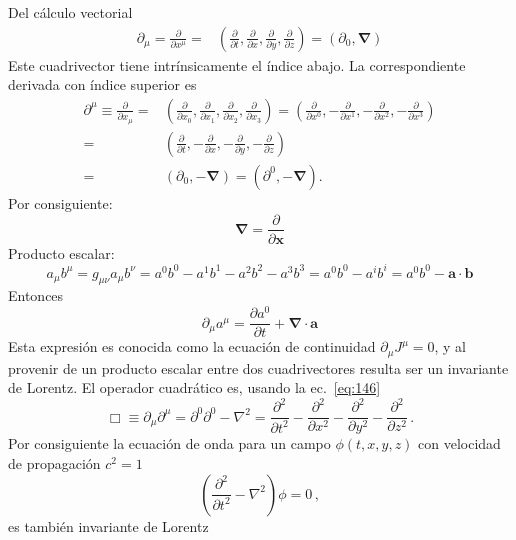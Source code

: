 \begin{frame}
  Del cálculo vectorial
  \begin{align}
      \partial_\mu=\frac{\partial}{\partial x^\mu}=&\left(
    \frac{\partial}{\partial t},\frac{\partial}{\partial x},\frac{\partial}{\partial y},\frac{\partial}{\partial z}
  \right)
  =(\partial_0,\boldsymbol{\nabla})
  \end{align}
Este cuadrivector tiene intrínsicamente el índice abajo. La correspondiente derivada con índice superior es  
\begin{align}
  \partial^\mu\equiv\frac{\partial}{\partial x_\mu}=&
  \left(
    \frac{\partial}{\partial x_0},\frac{\partial}{\partial x_1},\frac{\partial}{\partial x_2},\frac{\partial}{\partial x_3}
  \right)=\left(
    \frac{\partial}{\partial x^0},-\frac{\partial}{\partial x^1},-\frac{\partial}{\partial x^2},-\frac{\partial}{\partial x^3}
  \right)\nonumber\\
  =&\left(
    \frac{\partial}{\partial t},-\frac{\partial}{\partial x},-\frac{\partial}{\partial y},-\frac{\partial}{\partial z}
  \right)\nonumber\\
  =&(\partial_0,-\boldsymbol{\nabla})=(\partial^0,-\boldsymbol{\nabla}).
\end{align}
Por consiguiente:
\begin{equation}
  \label{eq:nabla}
  \boldsymbol{\nabla}=\frac{\partial}{\partial\mathbf{x}}
\end{equation}
Producto escalar:
\begin{equation}
  a_\mu b^\mu=g_{\mu\nu}a_\mu b^\nu=a^0b^0-a^1b^1-a^2b^2-a^3b^3=a^0b^0-a^i b^i=a^0b^0-\mathbf{a}\cdot \mathbf{b}
\end{equation}
Entonces
\begin{equation}
  \partial_\mu a^\mu=\frac{\partial a^0}{\partial t}+\boldsymbol{\nabla}\cdot\mathbf{a}
\end{equation}
Esta expresión es conocida como la ecuaci\'on de continuidad $\partial_\mu J^\mu=0$, y al provenir de un producto escalar entre dos cuadrivectores resulta ser un invariante de Lorentz.
El operador cuadrático es, usando la ec.~\eqref{eq:146}
\begin{equation}
  \label{eq:dalambertian}
  \Box\equiv \partial_\mu\partial^\mu=\partial^0\partial^0-\nabla^2 =\frac{\partial^2}{\partial t^2}-\frac{\partial^2}{\partial x^2}-\frac{\partial^2}{\partial y^2}-\frac{\partial^2}{\partial z^2}\,.
\end{equation}
Por consiguiente la ecuaci\'on de onda para un campo $\phi(t,x,y,z)$  con velocidad de propagación $c^2=1$
\begin{equation}
  \left(
\frac{\partial^2}{\partial t^2}-\nabla^2
  \right)\phi=0\,,
\end{equation}
es también invariante de Lorentz
\end{frame}

